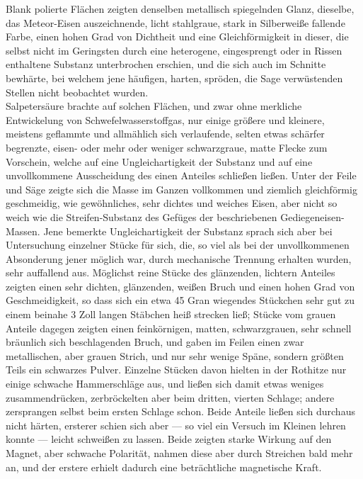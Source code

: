 \documentclass[a4paper, 11pt, oneside, german]{article}
\begin{document}
{Blank polierte Flächen zeigten denselben metallisch spiegelnden Glanz, dieselbe, das Meteor-Eisen auszeichnende, licht stahlgraue, stark in Silberweiße fallende Farbe, einen hohen Grad von Dichtheit und eine Gleichförmigkeit in dieser, die selbst nicht im Geringsten durch eine heterogene, eingesprengt oder in Rissen enthaltene Substanz unterbrochen erschien, und die sich auch im Schnitte bewhärte, bei welchem jene häufigen, harten, spröden, die Sage verwüstenden Stellen nicht beobachtet wurden.\\
Salpetersäure brachte auf solchen Flächen, und zwar ohne merkliche Entwickelung von Schwefelwasserstoffgas, nur einige größere und kleinere, meistens geflammte und allmählich sich verlaufende, selten etwas schärfer begrenzte, eisen- oder mehr oder weniger schwarzgraue, matte Flecke zum Vorschein, welche auf eine Ungleichartigkeit der Substanz und auf eine unvollkommene Ausscheidung des einen Anteiles schließen ließen. Unter der Feile und Säge zeigte sich die Masse im Ganzen vollkommen und ziemlich gleichförmig geschmeidig, wie gewöhnliches, sehr dichtes und weiches Eisen, aber nicht so weich wie die Streifen-Substanz des Gefüges der beschriebenen Gediegeneisen-Massen. Jene bemerkte Ungleichartigkeit der Substanz sprach sich aber bei Untersuchung einzelner Stücke für sich, die, so viel als bei der unvollkommenen Absonderung jener möglich war, durch mechanische Trennung erhalten wurden, sehr auffallend aus. Möglichst reine Stücke des glänzenden, lichtern Anteiles zeigten einen sehr dichten, glänzenden, weißen Bruch und einen hohen Grad von Geschmeidigkeit, so dass sich ein etwa 45 Gran wiegendes Stückchen sehr gut zu einem beinahe 3 Zoll langen Stäbchen heiß strecken ließ; Stücke vom grauen Anteile dagegen zeigten einen feinkörnigen, matten, schwarzgrauen, sehr schnell bräunlich sich beschlagenden Bruch, und gaben im Feilen einen zwar metallischen, aber grauen Strich, und nur sehr wenige Späne, sondern größten Teils ein schwarzes Pulver. Einzelne Stücken davon hielten in der Rothitze nur einige schwache Hammerschläge aus, und ließen sich damit etwas weniges zusammendrücken, zerbröckelten aber beim dritten, vierten Schlage; andere zersprangen selbst beim ersten Schlage schon. Beide Anteile ließen sich durchaus nicht härten, ersterer schien sich aber --- so viel ein Versuch im Kleinen lehren konnte --- leicht schweißen zu lassen. Beide zeigten starke Wirkung auf den Magnet, aber schwache Polarität, nahmen diese aber durch Streichen bald mehr an, und der erstere erhielt dadurch eine beträchtliche magnetische Kraft.\\
}
\end{document}
